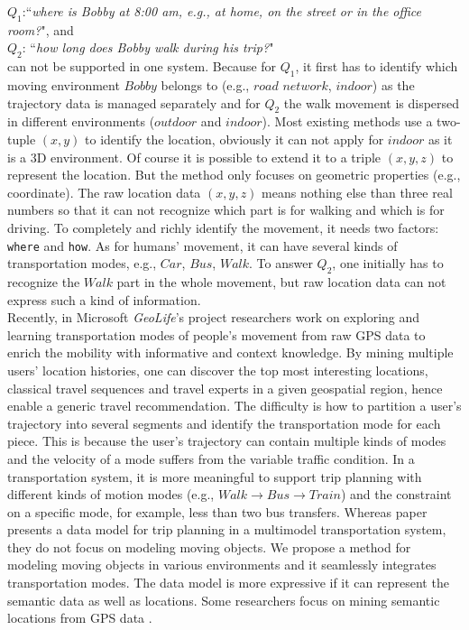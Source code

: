  $Q_1$:``\textit{where is Bobby at 8:00 am, e.g., at home, on the street or in the office room?}", and\\

$Q_2$: ``\textit{how long does Bobby walk during his trip?}" \\

can not be supported in one system. Because for $Q_1$, it first has to identify which
moving environment $Bobby$ belongs to (e.g., $road$ $network$, $indoor$) as the trajectory 
data is managed separately and for $Q_2$ the
walk movement is dispersed in different environments ($outdoor$ and $indoor$). Most existing methods \cite{PO+97,WX+98,FG+00,GBE+00} use a two-tuple
$(x,y)$ to identify the location, obviously it can not apply for $indoor$ as
it is a 3D environment. Of course it is possible to extend it to a triple $(x,y,z)$ to
represent the location. But the method only focuses on geometric properties 
(e.g., coordinate). The raw location data $(x,y,z)$ means nothing else than three real numbers 
so that it can not recognize which part is
for walking and which is for driving. To completely and richly identify 
the movement, it needs two factors: \texttt{where} and \texttt{how}. 
As for humans' movement, it can 
have several kinds of transportation modes, e.g., $Car$, $Bus$, $Walk$. To answer $Q_2$, one initially
has to recognize the $Walk$ part in the whole movement, but raw location data 
can not express such a kind of information. \\

Recently, in Microsoft \textit{GeoLife}'s project \cite{GeoLife} researchers work on exploring and 
learning transportation modes of people's movement \cite{ZLWX08,ZLCXM08,ZCXM09} from raw 
GPS data to enrich the mobility with informative and context knowledge. By
mining multiple users' location histories, one can discover the top most interesting 
locations, classical travel sequences and travel experts in a given geospatial region,
hence enable a generic travel recommendation. The difficulty is how to partition a user's trajectory into several segments and identify the transportation mode for each piece. This is because the user's trajectory can contain multiple kinds of modes and the
velocity of a mode suffers from the variable traffic condition. 
In a transportation system, it is more meaningful to support trip planning with different 
kinds of motion modes (e.g., $Walk\rightarrow Bus\rightarrow Train$) and the constraint 
on a specific mode, for example, less than two bus transfers.
Whereas paper \cite{BSWC09} presents a data model for trip planning in a multimodel 
transportation system, they do not focus on modeling moving 
objects. We propose a method for modeling moving objects in various environments and it seamlessly integrates transportation modes. The data model is more expressive if it can represent the semantic data as well as locations. Some researchers focus on mining semantic locations from GPS data \cite{LWY2006,ZZXM09,CCJ10}. \\


